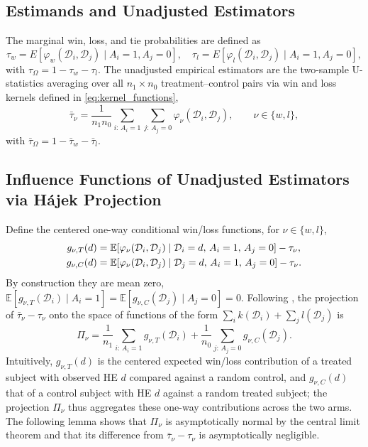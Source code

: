 \documentclass[11pt,a4paper]{article}
\newcommand{\E}{\mathbb{E}}
\begin{document}
\subsection{Estimands and Unadjusted Estimators}
\label{subsec:estimands}
The marginal win, loss, and tie probabilities are defined as 
\[
\tau_w = E\!\left[\varphi_w(\mathcal{D}_i, \mathcal{D}_j) \mid A_i = 1, A_j = 0\right],
\quad
\tau_l = E\!\left[\varphi_l(\mathcal{D}_i, \mathcal{D}_j) \mid A_i = 1, A_j = 0\right],
\]
with $\tau_\Omega = 1-\tau_w - \tau_l$. The unadjusted empirical estimators are the two-sample U-statistics averaging over all $n_1 \times n_0$ treatment--control pairs via win and loss kernels defined in \eqref{eq:kernel_functions},
\begin{equation}
\bar{\tau}_\nu = \frac{1}{n_1 n_0} \sum_{i:\, A_i = 1} \sum_{j:\, A_j = 0} \varphi_\nu(\mathcal{D}_i, \mathcal{D}_j),
\qquad \nu \in \{w, l\},
\label{eq:u_statistics}
\end{equation}
with $\bar{\tau}_\Omega = 1 - \bar{\tau}_w - \bar{\tau}_l$.


\subsection{Influence Functions of Unadjusted Estimators via H\'ajek Projection}
Define the centered one-way conditional win/loss functions, for $\nu\in\{w,l\}$,
\begin{align}
    g_{\nu,T}(d) &= \E\!\left[\varphi_\nu(\mathcal{D}_i, \mathcal{D}_j) \mid \mathcal{D}_i = d,\, A_i = 1,\, A_j = 0\right]-\tau_\nu, \notag\\
    g_{\nu,C}(d) &= \E\!\left[\varphi_\nu(\mathcal{D}_i, \mathcal{D}_j) \mid \mathcal{D}_j = d,\, A_i = 1,\, A_j = 0\right]-\tau_\nu.
    \label{eq:g_functions}
\end{align}
By construction they are mean zero,
$\E[g_{\nu,T}(\mathcal{D}_i)\mid A_i=1]=\E[g_{\nu,C}(\mathcal{D}_j)\mid A_j=0]=0$. Following \citet[][\S12.2]{vandervaart_asymptotic_1998}, the projection of
$\bar{\tau}_\nu-\tau_\nu$ onto the space of functions of the form
$\sum_i k(\mathcal{D}_i)+\sum_j l(\mathcal{D}_j)$ is
\begin{equation}\label{eq:HajekU}
    \Pi_\nu = \frac1{n_1}\sum_{i:\,A_i=1} g_{\nu,T}(\mathcal{D}_i)
             +\frac1{n_0}\sum_{j:\,A_j=0} g_{\nu,C}(\mathcal{D}_j).
\end{equation}
Intuitively, $g_{\nu,T}(d)$ is the centered expected win/loss contribution of a treated
subject with observed HE $d$ compared against a random control, and $g_{\nu,C}(d)$ that of
a control subject with HE $d$ against a random treated subject; the projection $\Pi_\nu$
thus aggregates these one-way contributions across the two arms. The following lemma shows
that $\Pi_\nu$ is asymptotically normal by the central limit theorem and that its
difference from $\bar{\tau}_\nu-\tau_\nu$ is asymptotically negligible.
\end{document}
